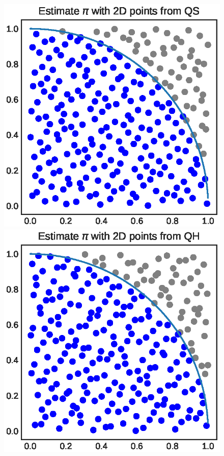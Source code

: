 \documentclass[shortabstract]{iithesis}
\begin{document}
\newpage

\begin{figure}[!ht]
    \centering
    \includegraphics[scale=.6]{QS_2D_circle.eps}
    \includegraphics[scale=.6]{QH_2D_circle.eps}


\end{figure}
\end{document}
